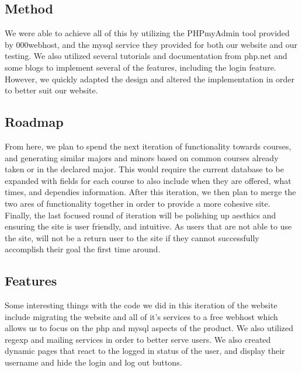 \documentclass{article}
\begin{document}
\begin{doublespace}
\subsection*{Method}
\indent We were able to achieve all of this by utilizing the PHPmyAdmin tool provided by 000webhost, and the mysql service they provided for both our website and our testing. We also utilized several tutorials and documentation from php.net and some blogs to implement several of the features, including the login feature. However, we quickly adapted the design and altered the implementation in order to better suit our website.

\subsection*{Roadmap}
\indent From here, we plan to spend the next iteration of functionality towards courses, and generating similar majors and minors based on common courses already taken or in the declared major. This would require the current database to be expanded with fields for each course to also include when they are offered, what times, and dependies information. After this iteration, we then plan to merge the two ares of functionality together in order to provide a more cohesive site. Finally, the last focused round of iteration will be polishing up aesthics and ensuring the site is user friendly, and intuitive. As users that are not able to use the site, will not be a return user to the site if they cannot successfully accomplish their goal the first time around.

\subsection*{Features}
\indent Some interesting things with the code we did in this iteration of the website include migrating the website and all of it's services to a free webhost which allows us to focus on the php and mysql aspects of the product. We also utilized regexp and mailing services in order to better serve users. We also created dynamic pages that react to the logged in status of the user, and display their username and hide the login and log out buttons.


\end{doublespace}
\end{document}
